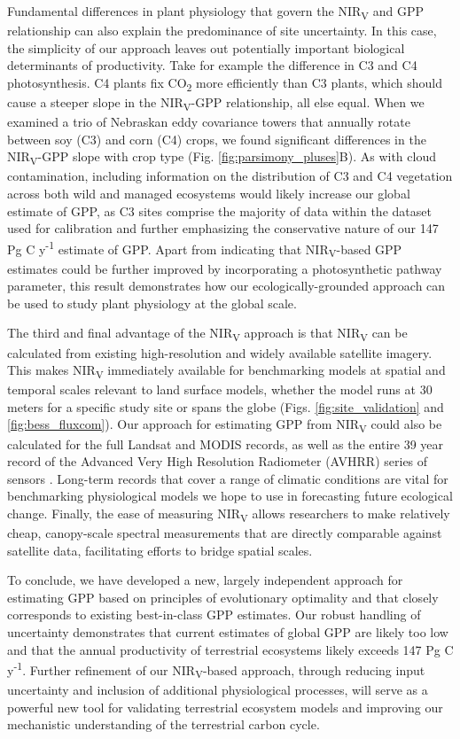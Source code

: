 \documentclass[10pt,letterpaper]{article}
\begin{document}
Fundamental differences in plant physiology that govern the NIR\textsubscript{V} and GPP relationship can also explain the predominance of site uncertainty. In this case, the simplicity of our approach leaves out potentially important biological determinants of productivity. Take for example the difference in C3 and C4 photosynthesis. C4 plants fix CO\textsubscript{2} more efficiently than C3 plants, which should cause a steeper slope in the NIR\textsubscript{V}-GPP relationship, all else equal. When we examined a trio of Nebraskan eddy covariance towers that annually rotate between soy (C3) and corn (C4) crops, we found significant differences in the NIR\textsubscript{V}-GPP slope with crop type (Fig. \ref{fig:parsimony_pluses}B). As with cloud contamination, including information on the distribution of C3 and C4 vegetation across both wild and managed ecosystems would likely increase our global estimate of GPP, as C3 sites comprise the majority of data within the dataset used for calibration and further emphasizing the conservative nature of our 147 Pg C y\textsuperscript{-1} estimate of GPP.  Apart from indicating that NIR\textsubscript{V}-based GPP estimates could be further improved by incorporating a photosynthetic pathway parameter, this result demonstrates how our ecologically-grounded approach can be used to study plant physiology at the global scale.

The third and final advantage of the NIR\textsubscript{V} approach is that NIR\textsubscript{V} can be calculated from existing high-resolution and widely available satellite imagery. This makes NIR\textsubscript{V} immediately available for benchmarking models at spatial and temporal scales relevant to land surface models, whether the model runs at 30 meters for a specific study site or spans the globe (Figs. \ref{fig:site_validation} and \ref{fig:bess_fluxcom}). Our approach for estimating GPP from NIR\textsubscript{V} could also be calculated for the full Landsat and MODIS records, as well as the entire 39 year record of the Advanced Very High Resolution Radiometer (AVHRR) series of sensors \cite{brown2006evaluation}.  Long-term records that cover a range of climatic conditions are vital for benchmarking physiological models we hope to use in forecasting future ecological change. Finally, the ease of measuring NIR\textsubscript{V} allows researchers to make relatively cheap, canopy-scale spectral measurements that are directly comparable against satellite data, facilitating efforts to bridge spatial scales.

To conclude, we have developed a new, largely independent approach for estimating GPP based on principles of evolutionary optimality and that closely corresponds to existing best-in-class GPP estimates. Our robust handling of uncertainty demonstrates that current estimates of global GPP are likely too low and that the annual productivity of terrestrial ecosystems likely exceeds 147 Pg C y\textsuperscript{-1}.  Further refinement of our NIR\textsubscript{V}-based approach, through reducing input uncertainty and inclusion of additional physiological processes, will serve as a powerful new tool for validating terrestrial ecosystem models and improving our mechanistic understanding of the terrestrial carbon cycle.  
\end{document}
